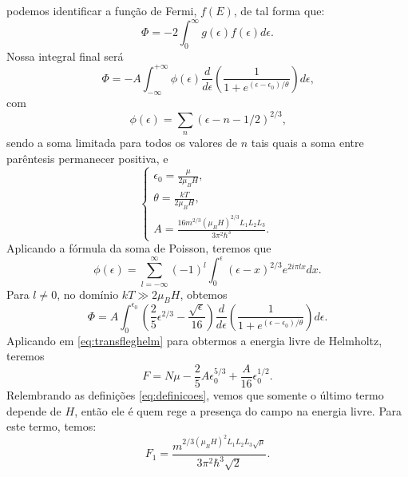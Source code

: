 \documentclass{article}
\begin{document}
podemos identificar a função de Fermi, $f(E)$, de tal forma que:
\begin{equation}
 \Phi = -2 \int_{0}^{\infty}g(\epsilon)f(\epsilon) d\epsilon\text{.}
\end{equation}
Nossa integral final será
\begin{equation}
 \Phi = - A \int_{-\infty}^{+\infty} \phi(\epsilon) \frac{d}{d\epsilon}\left(
 \frac{1}{1+e^{(\epsilon - \epsilon_0)\slash\theta}}\right) d\epsilon \text{,}
\end{equation}
com
\begin{equation}
 \phi(\epsilon) = \sum_{n} (\epsilon - n - 1\slash 2)^{2 \slash 3}\text{,}
\end{equation}
sendo a soma limitada para todos os valores de $n$ tais quais a soma entre parêntesis permanecer positiva, e
\begin{equation}\label{eq:definicoes}
 \begin{cases}
  \epsilon_0 = \frac{\mu}{2\mu_B H}\text{,}\\
  \theta = \frac{kT}{2\mu_B H}\text{,}\\
  A = \frac{16 m^{2\slash 3}(\mu_B H)^{2 \slash 3} L_1 L_2 L_3}{3 \pi^2 \hbar^{3}}\text{.}\
 \end{cases}
\end{equation}
Aplicando a fórmula da soma de Poisson, teremos que
\begin{equation}
 \phi(\epsilon) = \sum_{l = -\infty}^{\infty} (-1)^{l} \int_{0}^{\epsilon} (\epsilon - x)^{2 \slash 3}e^{2i\pi l x} dx\text{.}
\end{equation}
Para $l \neq 0$, no domínio $kT \gg 2 \mu_B H$, obtemos
\begin{equation}
 \Phi = A \int_{0}^{\epsilon_0}\left( \frac{2}{5}\epsilon^{2\slash3} -
 \frac{\sqrt{\epsilon}}{16}\right)\frac{d}{d\epsilon}
 \left( \frac{1}{1+e^{(\epsilon - \epsilon_0)\slash\theta}}\right)d\epsilon \text{.}
\end{equation}
Aplicando em \eqref{eq:transfleghelm} para obtermos a energia livre de Helmholtz, teremos
\begin{equation}
 F = N\mu - \frac{2}{5}A\epsilon_{0}^{5\slash3} + \frac{A}{16}\epsilon_{0}^{1\slash2}\text{.}
\end{equation}
Relembrando as definições \eqref{eq:definicoes}, vemos que somente o último termo depende de $H$, então ele é quem rege
a presença do campo na energia livre. Para este termo, temos:
\begin{equation}
 F_{1} = \frac{m^{2 \slash 3 (\mu_B H)^2 L_1 L_2 L_3 \sqrt{\mu}}}{3 \pi^2 \hbar^3 \sqrt{2}}\text{.}
\end{equation}
\end{document}
